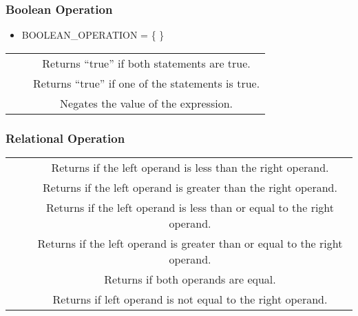\subsubsection{Boolean Operation}
\begin{itemize}
  \item BOOLEAN\_OPERATION = \{ \cd{ \&\&, ||, ! } \}
\end{itemize}

\begin{center}
\begin{tabulary}{\linewidth}{|C|C|C|}
  \hline
   &  &  \\
  \hline
  \hline
  \cd{\&\&} &  & Returns ``true'' if both statements are true.\\
  \hline
  \cd{||} &  & Returns ``true'' if one of the statements is true.\\
  \hline
  \cd{!} &  & Negates the value of the expression.\\
  \hline
\end{tabulary}
\end{center}

\subsubsection{Relational Operation}

\begin{center}
\begin{tabulary}{\linewidth}{|C|C|C|}
  \hline
   &  &  \\
  \hline
  \hline
  \cd{<} &  & Returns  if the left operand is less than the right operand. \\
  \hline
  \cd{>} &  & Returns  if the left operand is greater than the right operand. \\
  \hline
  \cd{<=} &  & Returns  if the left operand is less than or equal to the right operand.\\
  \hline
  \cd{>=} &  & Returns  if the left operand is greater than or equal to the right operand.\\
  \hline
  \cd{==} &  & Returns  if both operands are equal.\\
  \hline
  \cd{!=} &  & Returns  if left operand is not equal to the right operand.\\
  \hline
\end{tabulary}
\end{center}